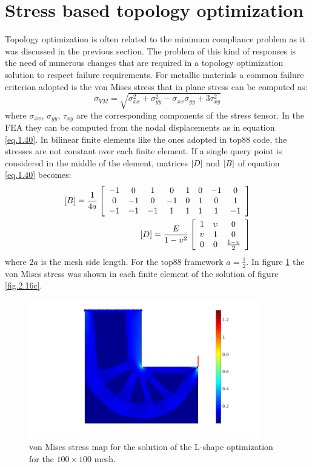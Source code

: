 \section{Stress based topology optimization}
\label{Sec2.3}
Topology optimization is often related to the minimum compliance problem as it was discussed in the previous section. The problem of this kind of responses is the need of numerous changes that are required in a topology optimization solution to respect failure requirements. For metallic materials a common failure criterion adopted is the von Mises stress that in plane stress can be computed as:
\begin{equation}
\sigma_{VM}=\sqrt{\sigma_{xx}^2+\sigma_{yy}^2-\sigma_{xx}\sigma_{yy}+3\tau_{xy}^2}
\end{equation}
where $\sigma_{xx}$, $\sigma_{yy}$, $\tau_{xy}$ are the corresponding components of the stress tensor. In the FEA they can be computed from the nodal displacements as in equation \eqref{eq.1.40}. In bilinear finite elements like the ones adopted in top88 code, the stresses are not constant over each finite element. If a single query point is considered in the middle of the element, matrices $\left[{D}\right]$ and $\left[{B}\right]$ of equation \eqref{eq.1.40} becomes:
\begin{eqnarray}
\left[{B}\right]=\frac{1}{4a}\left[{\begin{array}{cccccccc}
-1 & 0 & 1 & 0 & 1 & 0 & -1 & 0\\
0 & -1 & 0 & -1 & 0 & 1 & 0 & 1\\
-1 & -1 & -1 & 1 & 1 & 1 & 1 & -1
\end{array}}\right]\\
\left[{D}\right]=\frac{E}{1-\upsilon^2}\left[{\begin{array}{ccc}
1 & \upsilon & 0 \\
\upsilon & 1 & 0 \\
0 & 0 & \frac{1-\upsilon}{2}
\end{array}}\right]
\end{eqnarray}
where $2a$ is the mesh side length. For the top88 framework $a=\frac{1}{2}$.  
In figure \ref{fig.2.17} the von Mises stress was shown in each finite element of the solution of figure \ref{fig.2.16c}. 
\begin{figure}[ht]
\centering
\includegraphics[width=0.9\textwidth]{images/Ch2/L-shapenelx_100nely_100_R_8_volfrac_40_ft_3VM_stress}
\caption{von Mises stress map for the solution of the L-shape optimization for the $100\times100$ mesh.}
\label{fig.2.17}
\end{figure}
